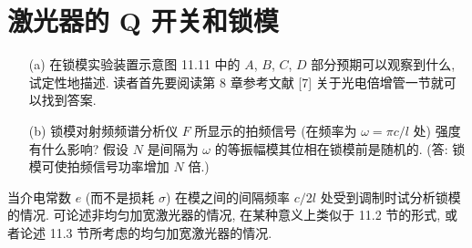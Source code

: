 \documentclass{note}
\begin{document}
\setcounter{chapter}{10}
\fi
\chapter{激光器的 Q 开关和锁模}
\begin{exe}
    \begin{itemize}
        \item[(a)] 在锁模实验装置示意图 11.11 中的 $A$, $B$, $C$, $D$ 部分预期可以观察到什么, 试定性地描述. 读者首先要阅读第 8 章参考文献 [7] 关于光电倍增管一节就可以找到答案.
        \item[(b)] 锁模对射频频谱分析仪 $F$ 所显示的拍频信号 (在频率为 $\omega=\pi c/l$ 处) 强度有什么影响? 假设 $N$ 是间隔为 $\omega$ 的等振幅模其位相在锁模前是随机的. (答: 锁模可使拍频信号功率增加 $N$ 倍.)
    \end{itemize}
\end{exe}
\begin{sol}

\end{sol}

\begin{exe}
    当介电常数 $e$ (而不是损耗 $\sigma$) 在模之间的间隔频率 $c/2l$ 处受到调制时试分析锁模的情况. 可论述非均匀加宽激光器的情况, 在某种意义上类似于 11.2 节的形式, 或者论述 11.3 节所考虑的均匀加宽激光器的情况.
\end{exe}
\begin{sol}

\end{sol}
\ifx\allfiles\undefined
\end{document}
